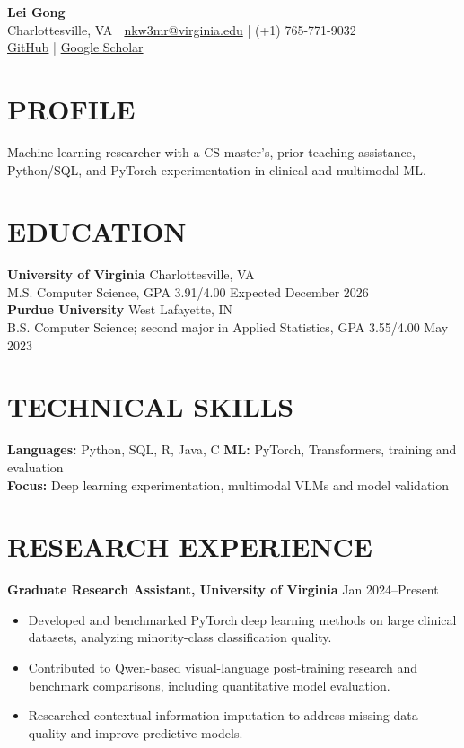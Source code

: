 \documentclass[10pt, letterpaper]{article}
\begin{document}
\setlength{\parindent}{0pt}
\begin{center}
{\fontsize{23}{25}\selectfont\textbf{Lei Gong}}\\[3pt]
Charlottesville, VA \quad | \quad \href{mailto:nkw3mr@virginia.edu}{nkw3mr@virginia.edu} \quad | \quad (+1) 765-771-9032\\[2pt]
\href{https://github.com/LeiGong0125Carrot}{GitHub} \quad | \quad \href{https://scholar.google.com/citations?user=8QLAkKMAAAAJ}{Google Scholar}
\end{center}
\vspace{-3mm}
\section{PROFILE}
Machine learning researcher with a CS master's, prior teaching assistance, Python/SQL, and PyTorch experimentation in clinical and multimodal ML.
\section{EDUCATION}
\textbf{University of Virginia} \hfill Charlottesville, VA \\
M.S. Computer Science, GPA 3.91/4.00 \hfill Expected December 2026\\[1pt]
\textbf{Purdue University} \hfill West Lafayette, IN \\
B.S. Computer Science; second major in Applied Statistics, GPA 3.55/4.00 \hfill May 2023
\section{TECHNICAL SKILLS}
\textbf{Languages:} Python, SQL, R, Java, C \quad \textbf{ML:} PyTorch, Transformers, training and evaluation\\
\textbf{Focus:} Deep learning experimentation, multimodal VLMs and model validation
\section{RESEARCH EXPERIENCE}
\textbf{Graduate Research Assistant, University of Virginia} \hfill Jan 2024--Present
\begin{itemize}
\item Developed and benchmarked PyTorch deep learning methods on large clinical datasets, analyzing minority-class classification quality.
\item Contributed to Qwen-based visual-language post-training research and benchmark comparisons, including quantitative model evaluation.
\item Researched contextual information imputation to address missing-data quality and improve predictive models.
\end{itemize}
\end{document}
